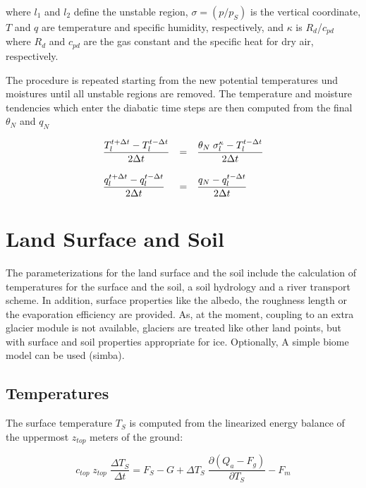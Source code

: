 where $l_1$ and $l_2$ define the unstable region, $\sigma = (p/p_S)$ is the vertical coordinate,
$T$ and $q$ are temperature and specific humidity, respectively, and $\kappa$ is
$R_d$/$c_{pd}$ where $R_d$ and $c_{pd}$ are the gas constant and the specific heat for dry
air,
respectively.

The procedure is repeated starting from the new potential temperatures und moistures until all
unstable regions are removed. The temperature and moisture tendencies which enter the diabatic
time steps are then computed from the final $\theta_N$ and $q_N$

\begin{equation}
\begin{array}{lcl}
\displaystyle \frac{T_l^{t+\Delta t}-T_l^{t-\Delta t}}{2\Delta t} & = & \displaystyle \frac{\theta_N
 \; \sigma_l^{\kappa} -T_l^{t-\Delta t}}{2\Delta t} \\
&&\\
\displaystyle \frac{q_l^{t+\Delta t}-q_l^{t-\Delta t}}{2\Delta t} & = & \displaystyle \frac{q_N - q_l^{t-\Delta
t}}{2\Delta t} 
\end{array}
\end{equation}

\newpage

\section{Land Surface and Soil \label{landmod}} 

The parameterizations for the land surface and the soil
include the calculation of temperatures
for the surface and the soil, a soil hydrology and a river
transport scheme. In addition, surface
properties like the albedo, the roughness length or the
evaporation efficiency are provided.
As, at the moment,  coupling to an extra glacier
module is not available, glaciers are treated like
other land points, but with surface and soil properties
appropriate for ice. Optionally, A simple biome model can be used (simba).

\subsection{Temperatures}\label{surtemp}

The surface temperature $T_S$ is computed from
the linearized energy balance of the
uppermost $z_{top}$ meters of the ground:

\begin{equation} \label{land.1}
c_{top} \;  z_{top} \; \frac{\Delta T_S}{\Delta t}
= F_S - G + \Delta T_S \; \frac{\partial (Q_a
-F_g)}{\partial T_S}  - F_m
\end{equation}

